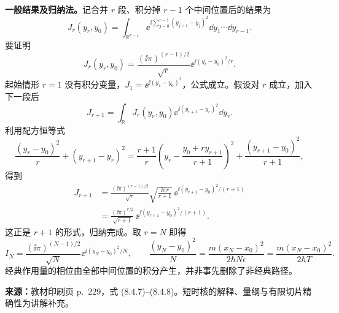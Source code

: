 \textbf{一般结果及归纳法。}记合并 $r$ 段、积分掉 $r-1$ 个中间位置后的结果为
\begin{equation}
  J_r(y_r,y_0)=\int_{\mathbb R^{r-1}}
    \ee^{\ii\sum_{j=0}^{r-1}(y_{j+1}-y_j)^2}
    \dd y_1\cdots\dd y_{r-1}.
\end{equation}
要证明
\begin{equation}
  \boxed{J_r(y_r,y_0)=\frac{(\ii\pi)^{(r-1)/2}}{\sqrt r}
    \ee^{\ii(y_r-y_0)^2/r}}.
  \label{eq:QM-C08-S04-induction}
\end{equation}
起始情形 $r=1$ 没有积分变量，$J_1=\ee^{\ii(y_1-y_0)^2}$，公式成立。假设对 $r$ 成立，加入下一段后
\begin{equation}
  J_{r+1}=\int_{\mathbb R}J_r(y_r,y_0)
    \ee^{\ii(y_{r+1}-y_r)^2}\dd y_r.
\end{equation}
利用配方恒等式
\begin{equation}
  \frac{(y_r-y_0)^2}{r}+(y_{r+1}-y_r)^2
  =\frac{r+1}{r}\left(y_r-\frac{y_0+r y_{r+1}}{r+1}\right)^2
    +\frac{(y_{r+1}-y_0)^2}{r+1},
\end{equation}
得到
\begin{align}
  J_{r+1}
  &=\frac{(\ii\pi)^{(r-1)/2}}{\sqrt r}
    \sqrt{\frac{\ii\pi r}{r+1}}\,
    \ee^{\ii(y_{r+1}-y_0)^2/(r+1)}\\
  &=\frac{(\ii\pi)^{r/2}}{\sqrt{r+1}}\,
    \ee^{\ii(y_{r+1}-y_0)^2/(r+1)}.
\end{align}
这正是 $r+1$ 的形式，归纳完成。取 $r=N$ 即得
\begin{equation}
  \boxed{I_N=\frac{(\ii\pi)^{(N-1)/2}}{\sqrt N}
    \ee^{\ii(y_N-y_0)^2/N}},\qquad
  \frac{(y_N-y_0)^2}{N}
    =\frac{m(x_N-x_0)^2}{2\hbar N\epsilon}
    =\frac{m(x_N-x_0)^2}{2\hbar T}.
\end{equation}
经典作用量的相位由全部中间位置的积分产生，并非事先删除了非经典路径。

\textbf{来源：}教材印刷页 p.~229，式 (8.4.7)--(8.4.8)。短时核的解释、量纲与有限切片精确性为讲解补充。

